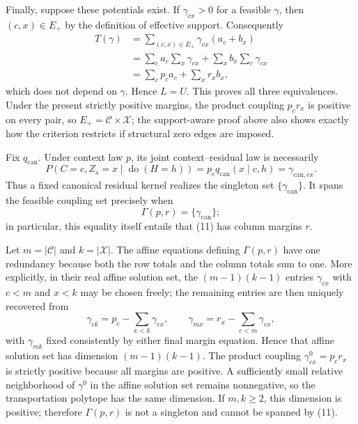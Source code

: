 Finally, suppose these potentials exist.  If \(\gamma_{cx}>0\) for a feasible \(\gamma\), then \((c,x)\in E_+\) by the definition of effective support.  Consequently
\[
\begin{aligned}
T(\gamma)
&=\sum_{(c,x)\in E_+}\gamma_{cx}(a_c+b_x)\\
&=\sum_c a_c\sum_x\gamma_{cx}+\sum_xb_x\sum_c\gamma_{cx}\\
&=\sum_cp_ca_c+\sum_xr_xb_x,
\end{aligned}
\tag{10}
\]
which does not depend on \(\gamma\).  Hence \(L=U\).  This proves all three equivalences.  Under the present strictly positive margins, the product coupling \(p_cr_x\) is positive on every pair, so \(E_+=\mathcal C\times\mathcal X\); the support-aware proof above also shows exactly how the criterion restricts if structural zero edges are imposed.

Fix \(q_{\mathrm{can}}\).  Under context law \(p\), its joint context--residual law is necessarily
\[
P(C=c,Z_s=x\mid\operatorname{do}(H=h))
=p_cq_{\mathrm{can}}(x\mid c,h)
=\gamma_{\mathrm{can},cx}.
\tag{11}
\]
Thus a fixed canonical residual kernel realizes the singleton set \(\{\gamma_{\mathrm{can}}\}\).  It spans the feasible coupling set precisely when
\[
\Gamma(p,r)=\{\gamma_{\mathrm{can}}\};
\]
in particular, this equality itself entails that (11) has column margins \(r\).

Let \(m=|\mathcal C|\) and \(k=|\mathcal X|\).  The affine equations defining \(\Gamma(p,r)\) have one redundancy because both the row totals and the column totals sum to one.  More explicitly, in their real affine solution set, the \((m-1)(k-1)\) entries \(\gamma_{cx}\) with \(c<m\) and \(x<k\) may be chosen freely; the remaining entries are then uniquely recovered from
\[
\gamma_{c k}=p_c-\sum_{x<k}\gamma_{cx},
\qquad
\gamma_{m x}=r_x-\sum_{c<m}\gamma_{cx},
\]
with \(\gamma_{mk}\) fixed consistently by either final margin equation.  Hence that affine solution set has dimension \((m-1)(k-1)\).  The product coupling \(\gamma^0_{cx}=p_cr_x\) is strictly positive because all margins are positive.  A sufficiently small relative neighborhood of \(\gamma^0\) in the affine solution set remains nonnegative, so the transportation polytope has the same dimension.  If \(m,k\geq2\), this dimension is positive; therefore \(\Gamma(p,r)\) is not a singleton and cannot be spanned by (11).

